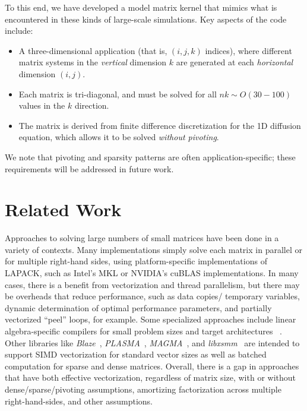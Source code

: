 \documentclass{sig-alternate-05-2015}
\begin{document}
To this end, we have developed a model matrix kernel that mimics what
  is encountered in these kinds of large-scale simulations.
Key aspects of the code include:
\begin{itemize}
\item A three-dimensional application (that is, \((i,j,k)\) indices),
  where different matrix systems in the \emph{vertical} dimension \(k\) are
  generated at each \emph{horizontal} dimension \((i,j)\). 
\item Each matrix is tri-diagonal, and must be solved for all 
  \(nk \sim O(30-100)\) values in the \(k\) direction.
\item The matrix is derived from finite difference discretization for the
  1D diffusion equation, which allows it to be solved \emph{without pivoting}.
\end{itemize}
We note that pivoting and sparsity patterns are often application-specific;
  these requirements will be addressed in future work.

\section{Related Work}
\label{sec:related_work}

Approaches to solving large numbers of small matrices have been done
  in a variety of contexts.
Many implementations simply solve each matrix in parallel or for multiple
  right-hand sides, using platform-specific
  implementations of LAPACK, such as Intel's MKL or NVIDIA's cuBLAS implementations.
In many cases, there is a benefit from vectorization and thread parallelism, 
  but there may be overheads that reduce performance, such as data copies/
  temporary variables, 
  dynamic determination of optimal performance parameters, 
  and partially vectorized ``peel'' loops, for example.
Some specialized approaches include linear algebra-specific 
  compilers for small problem sizes and target architectures 
 ~\cite{Spampinato:2014, NelsonEtAl_2015}.
Other libraries like 
  \emph{Blaze}~\cite{BlazeSite}, 
  \emph{PLASMA}~\cite{PLASMASite},
  \emph{MAGMA}~\cite{Haidar:2015}, and 
  \emph{libxsmm}~\cite{libxsmm_website}
  are intended to support SIMD vectorization for standard vector sizes
  as well as batched computation for sparse and dense matrices.
Overall, there is a gap in approaches that have both effective vectorization,
  regardless of matrix size, with or without dense/sparse/pivoting 
  assumptions, amortizing factorization across multiple right-hand-sides, 
  and other assumptions.
\end{document}
